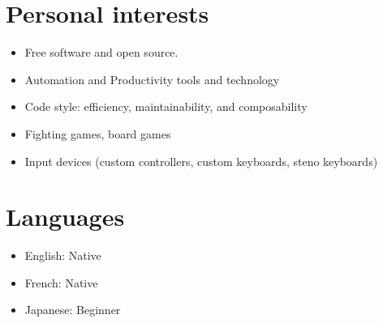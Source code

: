 \documentclass{res}
\newcommand{\inFrench}[1]{}
\newcommand{\inEnglish}[1]{#1}
\begin{document}
\begin{resume}

\inFrench{
	\section{Intérêts personnels}
}
\inEnglish{
	\section{Personal interests}
}
\vspace{6pt}


\inEnglish{
	\vspace{6pt}
	\begin{itemize} \itemsep -2pt
		\item Free software and open source.
		\item Automation and Productivity tools and technology
		\item Code style: efficiency, maintainability, and composability
		\item Fighting games, board games
		\item Input devices (custom controllers, custom keyboards, steno keyboards)
	\end{itemize}
}

\inEnglish{
	\section{Languages}
}
\vspace{6pt}

\inEnglish{
	\vspace{6pt}
	\begin{itemize} \itemsep -2pt
		\item English: Native
		\item French: Native
		\item Japanese: Beginner
	\end{itemize}
}


\end{resume}
\end{document}
